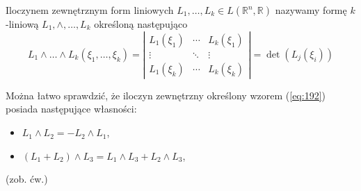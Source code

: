 \documentclass[leqno]{article}
\begin{document}
\begin{justify}
\begin{defn}
    Iloczynem zewnętrznym form liniowych $L_1, \ldots, L_k \in L(\mathbb{R}^n, \mathbb{R})$ nazywamy formę $k$-liniową $L_1, \land, \ldots, L_k$ określoną następująco 
    \begin{equation}\label{eq:192}
        L_1 \land \ldots \land L_k(\xi_1, \ldots, \xi_k) = \left|\begin{array}{ccc}
            L_1(\xi_1) & \cdots & L_k(\xi_1) \\
           \vdots & \ddots & \vdots \\
            L_1(\xi_k) & \cdots & L_k(\xi_k)
            \end{array}\right| = \det{(L_j(\xi_i))}
    \end{equation}
\end{defn}

Można łatwo sprawdzić, że iloczyn zewnętrzny określony wzorem (\ref{eq:192}) posiada następujące własności:

\begin{itemize}
    \item $L_1 \land L_2 = -L_2 \land L_1$,
    \item $(L_1 + L_2) \land L_3 = L_1 \land L_3 + L_2 \land L_3$,
\end{itemize}
(zob. ćw.)


\end{justify}
\end{document}
